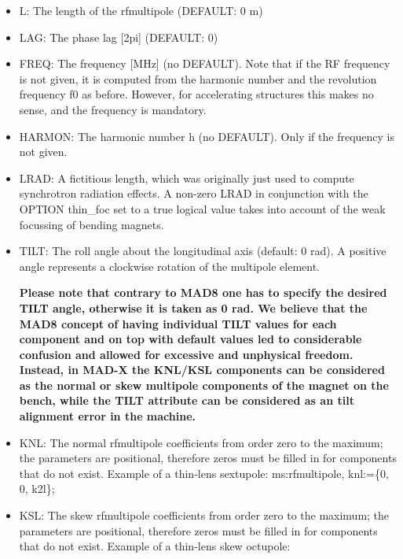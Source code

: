 \begin{itemize}
	\item L: The length of the rfmultipole (DEFAULT: 0 m) 
	\item LAG: The phase lag [2pi] (DEFAULT: 0) 
	\item FREQ: The frequency [MHz] (no DEFAULT). Note that if the RF           frequency is not given, it is computed from the harmonic           number and the revolution frequency f0 as before. However, for           accelerating structures this makes no sense, and the frequency           is mandatory. 
	\item HARMON: The harmonic number h (no DEFAULT). Only if the           frequency is not given. 
	\item LRAD: A fictitious length, which was originally just used to           compute synchrotron radiation effects. A non-zero LRAD in           conjunction with the OPTION thin\_foc set to a true logical           value takes into account of the weak focussing of bending           magnets. 
	\item TILT: The roll angle about the longitudinal axis (default: 0           rad). A positive angle represents a clockwise rotation of the           multipole element.           

\textbf{Please note that contrary to MAD8 one has to specify the               desired TILT angle, otherwise it is taken as 0 rad. We               believe that the MAD8 concept of having individual TILT               values for each component and on top with default values               led to considerable confusion and allowed for excessive               and unphysical freedom. Instead, in MAD-X the KNL/KSL               components can be considered as the normal or skew               multipole components of the magnet on the bench, while the               TILT attribute can be considered as an tilt alignment               error in the machine.}
	\item KNL: The normal rfmultipole coefficients from order zero to           the maximum; the parameters are positional, therefore zeros           must be filled in for components that do not exist. Example of           a thin-lens sextupole: ms:rfmultipole, knl:=\{0, 0, k2l\}; 
	\item KSL: The skew rfmultipole coefficients from order zero to           the maximum; the parameters are positional, therefore zeros           must be filled in for components that do not exist. Example of           a thin-lens skew octupole:           


\end{itemize}
